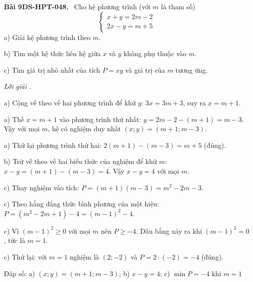 \documentclass[12pt,a4paper]{article}
\newenvironment{problem}[1][]{\par\medskip\noindent\textbf{Bài #1.}\ }{\par}
\newenvironment{solution}[1][]{\par\noindent\textit{Lời giải #1.}\par}{\par}
\begin{document}
\begin{problem}[9DS-HPT-048]
Cho hệ phương trình (với $m$ là tham số)
\[ \begin{cases} x + y = 2m - 2 \\ 2x - y = m + 5 \end{cases} \]
a) Giải hệ phương trình theo $m$.

b) Tìm một hệ thức liên hệ giữa $x$ và $y$ không phụ thuộc vào $m$.

c) Tìm giá trị nhỏ nhất của tích $P = xy$ và giá trị của $m$ tương ứng.

\begin{solution}
a) Cộng vế theo vế hai phương trình để khử $y$: $3x = 3m + 3$, suy ra $x = m + 1$.

a) Thế $x = m + 1$ vào phương trình thứ nhất: $y = 2m - 2 - (m + 1) = m - 3$. Vậy với mọi $m$, hệ có nghiệm duy nhất $(x; y) = (m + 1; m - 3)$.

a) Thử lại phương trình thứ hai: $2(m + 1) - (m - 3) = m + 5$ (đúng).

b) Trừ vế theo vế hai biểu thức của nghiệm để khử $m$: $x - y = (m + 1) - (m - 3) = 4$. Vậy $x - y = 4$ với mọi $m$.

c) Thay nghiệm vào tích: $P = (m + 1)(m - 3) = m^2 - 2m - 3$.

c) Theo hằng đẳng thức bình phương của một hiệu: $P = (m^2 - 2m + 1) - 4 = (m - 1)^2 - 4$.

c) Vì $(m - 1)^2 \geq 0$ với mọi $m$ nên $P \geq -4$. Dấu bằng xảy ra khi $(m - 1)^2 = 0$, tức là $m = 1$.

c) Thử lại: với $m = 1$ nghiệm là $(2; -2)$ và $P = 2 \cdot (-2) = -4$ (đúng).

Đáp số: a) $\boxed{(x; y) = (m + 1; m - 3)}$; b) $\boxed{x - y = 4}$; c) $\boxed{\min P = -4 \text{ khi } m = 1}$
\end{solution}
\end{problem}
\end{document}
